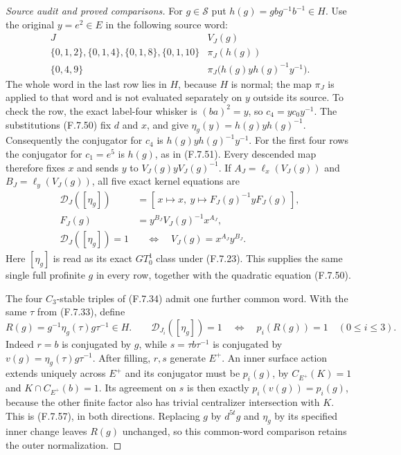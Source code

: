 \begin{proof}[Source audit and proved comparisons]
For $g\in\mathscr S$ put $h(g)=g b g^{-1}b^{-1}\in H$.
Use the original $y=e^2\in E$ in the following
source word:
\[
 \begin{array}{c|c}
 J& V_J(g)\\ \hline
 \{0,1,2\},\{0,1,4\},\{0,1,8\},\{0,1,10\}
       &\pi_J(h(g))\\
 \{0,4,9\}&
          \pi_J\bigl(h(g)y h(g)^{-1}y^{-1}\bigr).
 \end{array}                                                   \tag{F.7.55}
\]
The whole word in the last row lies in $H$,
because $H$ is normal; the map $\pi_J$ is
applied to that word and is not evaluated
separately on $y$ outside its source.
To check the row, the exact label-four
whisker is $(ba)^2=y$, so $c_4=yc_0y^{-1}$.
The substitutions (F.7.50) fix $d$ and $x$,
and give $\eta_g(y)=h(g)y h(g)^{-1}$.
Consequently the conjugator for $c_4$ is
$h(g)y h(g)^{-1}y^{-1}$.
For the first four rows the conjugator for
$c_1=e^5$ is $h(g)$, as in (F.7.51).
Every descended map therefore fixes $x$ and
sends $y$ to $V_J(g)yV_J(g)^{-1}$.
If $A_J=\ell_x(V_J(g))$ and
$B_J=\ell_y(V_J(g))$, all five exact kernel
equations are
\[
 \begin{split}
 \mathcal D_J([\eta_g])&=
       [\,x\mapsto x,\ 
          y\mapsto F_J(g)^{-1}yF_J(g)\,],\\
 F_J(g)&=y^{B_J}V_J(g)^{-1}x^{A_J},\\
 \mathcal D_J([\eta_g])=1
             &\quad\Longleftrightarrow\quad
                   V_J(g)=x^{A_J}y^{B_J}.
 \end{split}                                                   \tag{F.7.56}
\]
Here $[\eta_g]$ is read as its exact $GT_0^1$
class under (F.7.23).
This supplies the same single full profinite
$g$ in every row, together with the
quadratic equation (F.7.50).

The four $C_3$-stable triples of (F.7.34) admit
one further common word.  With the same
$\tau$ from (F.7.33), define
\[
 R(g)=g^{-1}\eta_g(\tau)g\tau^{-1}\in H.
 \qquad
 \mathcal D_{J_i}([\eta_g])=1
       \quad\Longleftrightarrow\quad p_i(R(g))=1
       \quad(0\leq i\leq3).
                                                               \tag{F.7.57}
\]
Indeed $r=b$ is conjugated by $g$, while
$s=\tau b\tau^{-1}$ is conjugated by
$v(g)=\eta_g(\tau)g\tau^{-1}$.
After filling, $r,s$ generate $E^+$.
An inner surface action extends uniquely across
$E^+$ and its conjugator must be $p_i(g)$,
by $C_{E^+}(K)=1$ and
$K\cap C_{E^+}(b)=1$.
Its agreement on $s$ is then exactly
$p_i(v(g))=p_i(g)$, because the other finite
factor also has trivial centralizer intersection
with $K$.  This is (F.7.57), in both directions.
Replacing $g$ by $d^{5t}g$ and $\eta_g$ by its
specified inner change leaves $R(g)$ unchanged,
so this common-word comparison retains the
outer normalization.


\end{proof}
